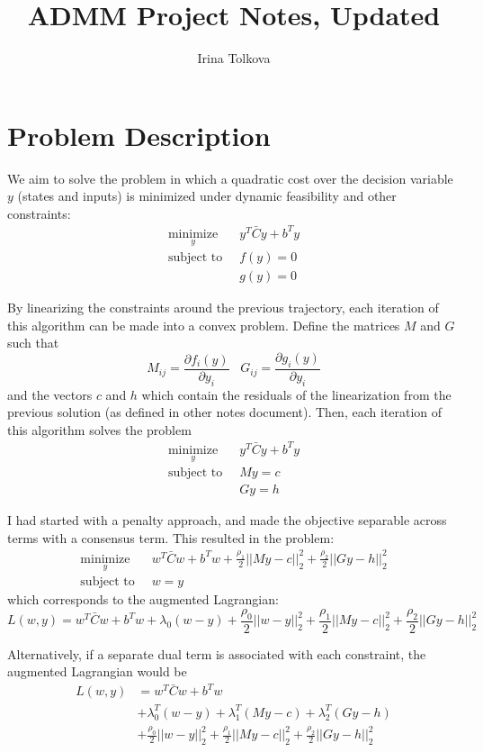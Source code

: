 \documentclass{article}
\title{ADMM Project Notes, Updated}
\author{Irina Tolkova}
\begin{document}
\maketitle

\tableofcontents

\section{Problem Description}

We aim to solve the problem in which a quadratic cost over the decision variable $y$ (states and inputs) is minimized under dynamic feasibility and other constraints:
\begin{align*}
\underset{y}{\text{minimize}} \; \; &y^T \bar{C} y + b^T y \\
\text{subject to} \; \; &f(y) = 0 \\
&g(y) = 0
\end{align*}

By linearizing the constraints around the previous trajectory, each iteration of this algorithm can be made into a convex problem. Define the matrices $M$ and $G$ such that
\[
M_{ij} = \frac{\partial f_i(y)}{\partial y_i} \;\;\; G_{ij} = \frac{\partial g_i(y)}{\partial y_i}
\]
and the vectors $c$ and $h$ which contain the residuals of the linearization from the previous solution (as defined in other notes document). Then, each iteration of this algorithm solves the problem
\begin{align*}
\underset{y}{\text{minimize}} \; \; &y^T \bar{C} y + b^T y \\
\text{subject to} \; \; &M y = c \\
&G y = h
\end{align*}

I had started with a penalty approach, and made the objective separable across terms with a consensus term. This resulted in the problem:
\begin{align*}
\underset{y}{\text{minimize}} \; \; &w^T \bar{C} w + b^T w + \frac{\rho_1}{2} ||My - c||_2^2 + \frac{\rho_2}{2} ||Gy - h||_2^2 \\
\text{subject to} \; \; &w = y
\end{align*}
which corresponds to the augmented Lagrangian:
\[
L(w, y) = w^T \bar{C} w + b^T w + \lambda_0 (w - y) + \frac{\rho_0}{2} ||w - y||_2^2 + \frac{\rho_1}{2} ||My - c||_2^2 + \frac{\rho_2}{2} ||Gy - h||_2^2
\]

Alternatively, if a separate dual term is associated with each constraint, the augmented Lagrangian would be
\begin{align*}
L(w, y) &= w^T \bar{C} w + b^T w \\
        &+ \lambda_0^T (w - y) + \lambda_1^T (My - c) + \lambda_2^T (Gy - h)\\
        &+ \frac{\rho_0}{2} ||w - y||_2^2 + \frac{\rho_1}{2} ||My - c||_2^2 + \frac{\rho_2}{2} ||Gy - h||_2^2
\end{align*}
\end{document}
